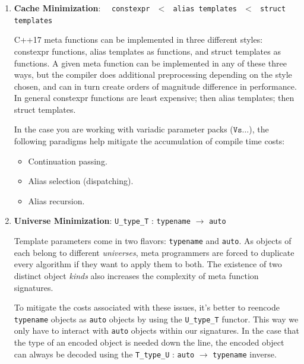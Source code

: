 \documentclass[twoside]{article}
\newcommand{\strong}[1]{{\bfseries #1}}
\begin{document}
\begin{minipage}{15cm}

\begin{enumerate}
\item \strong{Cache Minimization}: \ \ \texttt{constexpr $\:<\:$ alias templates $\:<\:$ struct templates}

	C++17 meta functions can be implemented in three different styles: constexpr functions, alias templates as functions,
	and struct templates as functions. A given meta function can be implemented in any of these three ways, but the compiler
	does additional preprocessing depending on the style chosen, and can in turn create orders of magnitude difference in
	performance. In general constexpr functions are least expensive; then alias templates; then struct templates.

	In the case you are working with variadic parameter packs ($ \texttt{Vs}\ldots $), the following paradigms help
	mitigate the accumulation of compile time costs:

	\begin{itemize}
	\item Continuation passing.
	\item Alias selection (dispatching).
	\item Alias recursion.
	\end{itemize}

\item \strong{Universe Minimization}: \texttt{U\_type\_T} : \texttt{typename} $ \to $ \texttt{auto}

	Template parameters come in two flavors: \texttt{typename} and \texttt{auto}. As objects of each belong
	to different \emph{universes}, meta programmers are forced to duplicate every algorithm if they want to apply
	them to both. The existence of two distinct object \emph{kinds} also increases the complexity of meta function
	signatures.

	To mitigate the costs associated with these issues, it's better to reencode \texttt{typename} objects as \texttt{auto}
	objects by using the \texttt{U\_type\_T} functor. This way we only have to interact with \texttt{auto} objects within
	our signatures. In the case that the type of an encoded object is needed down the line, the encoded object can always
	be decoded using the \texttt{T\_type\_U} : \texttt{auto} $ \to $ \texttt{typename} inverse.

\end{enumerate}

\end{minipage}\newpage\begin{minipage}{15cm}


\end{minipage}
\end{document}
